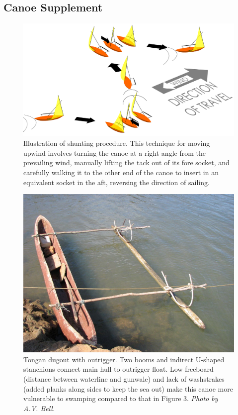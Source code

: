 \subsection{Canoe Supplement}

\begin{figure}[ht]
\begin{center}
\includegraphics[scale=0.45]{figures/canoes/ESMFigure1.pdf}
\caption{Illustration of shunting procedure.  This technique for moving upwind involves turning the canoe at a right angle from the prevailing wind, manually lifting the tack out of its fore socket, and carefully walking it to the other end of the canoe to insert in an equivalent socket in the aft, reversing the direction of sailing.}
\end{center}
\end{figure}

\begin{figure}[ht]
\begin{center}
\includegraphics[scale=0.4]{figures/canoes/ESMFigure2.jpg}
\caption{Tongan dugout with outrigger.  Two booms and indirect U-shaped stanchions connect main hull to outrigger float.  Low freeboard (distance between waterline and gunwale) and lack of washstrakes (added planks along sides to keep the sea out) make this canoe more vulnerable to swamping compared to that in Figure 3.  \textit{Photo by A.V. Bell. }}
\end{center}
\end{figure}

